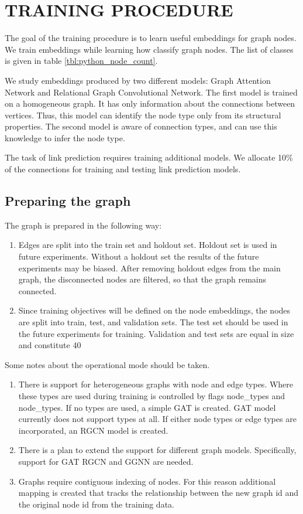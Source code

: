 \documentclass[a4paper,twoside]{article}
\begin{document}
\section{\uppercase{Training Procedure}}

The goal of the training procedure is to learn useful embeddings for graph nodes. We train embeddings while learning how classify graph nodes. The list of classes is given in table \ref{tbl:python_node_count}.

We study embeddings produced by two different models: Graph Attention Network and Relational Graph Convolutional Network. The first model is trained on a homogeneous graph. It has only information about the connections between vertices. Thus, this model can identify the node type only from its structural properties. The second model is aware of connection types, and can use this knowledge to infer the node type.

The task of link prediction requires training additional models. We allocate 10\% of the connections for training and testing link prediction models.

\subsection{Preparing the graph}
The graph is prepared in the following way:
\begin{enumerate}
    \item Edges are split into the train set and holdout set. Holdout set is used in future experiments. Without a holdout set the results of the future experiments may be biased. After removing holdout edges from the main graph, the disconnected nodes are filtered, so that the graph remains connected.
    \item Since training objectives will be defined on the node embeddings, the nodes are split into train, test, and validation sets. The test set should be used in the future experiments for training. Validation and test sets are equal in size and constitute 40%
\end{enumerate}

Some notes about the operational mode should be taken. 
\begin{enumerate}
    \item There is support for heterogeneous graphs with node and edge types. Where these types are used during training is controlled by flags node\_types and node\_types. If no types are used, a simple GAT is created. GAT model currently does not support types at all. If either node types or edge types are incorporated, an RGCN model is created. 
    \item There is a plan to extend the support for different graph models. Specifically, support for  GAT RGCN and GGNN are needed. 
    \item Graphs require contiguous indexing of nodes. For this reason additional mapping is created that tracks the relationship between the new graph id and the original node id from the training data.
\end{enumerate}
\end{document}
